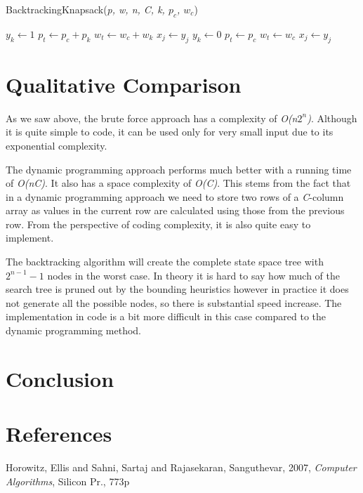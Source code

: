 \documentclass{article}
\begin{document}
\begin{algorithm}
	\caption{BacktrackingKnapsack(\textit{p, w, n, C, k, $p_{c}$, $w_{c}$})}\label{backtrackingKnapsack}
	\begin{algorithmic}[1]
			\State $y_{k} \gets 1$
				\State {}
			\EndIf
				\State $p_{t} \gets p_{c} + p_{k}$
				\State $w_{t} \gets w_{c} + w_{k}$
					\State $x_{j} \gets y_{j}$
				\EndFor
			\EndIf
		\EndIf
			\State $y_{k} \gets 0$
				\State {}
			\EndIf
				\State $p_{t} \gets p_{c}$
				\State $w_{t} \gets w_{c}$
					\State $x_{j} \gets y_{j}$
				\EndFor
			\EndIf
		\EndIf
		
	\end{algorithmic}		
\end{algorithm}

\section{Qualitative Comparison}
As we saw above, the brute force approach has a complexity of \textit{O(n$2^{n}$)}. Although it is quite simple to code, it can be used only for very small input due to its exponential complexity. 

The dynamic programming approach performs much better with a running time of \textit{O(nC)}. It also has a space complexity of \textit{O(C)}. This stems from the fact that in a dynamic programming approach we need to store two rows of a \textit{C}-column array as values in the current row are calculated using those from the previous row. From the perspective of coding complexity, it is also quite easy to implement.

The backtracking algorithm will create the complete state space tree with $2^{n-1}-1$ nodes in the worst case. In theory it is hard to say how much of the search tree is pruned out by the bounding heuristics however in practice it does not generate all the possible nodes, so there is substantial speed increase. The implementation in code is a bit more difficult in this case compared to the dynamic programming method.

\section{Conclusion}

\section{References}
Horowitz, Ellis and Sahni, Sartaj and Rajasekaran, Sanguthevar, 2007, \textit{Computer Algorithms}, Silicon Pr., 773p
\end{document}
